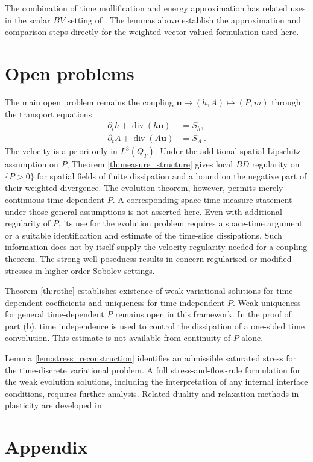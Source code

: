 \documentclass{article}
\theoremstyle{definition}
\newcommand{\bfu}{\boldsymbol{u}}
\renewcommand\div{\operatorname{\mathrm{div}}}
\begin{document}
The combination of time mollification and energy approximation has related
uses in the scalar $BV$ setting of \cite[Sections 3 and 4]{E25}. The lemmas above establish
the approximation and comparison steps directly for the weighted
vector-valued formulation used here.

\section{Open problems}
The main open problem remains the coupling
$\bfu\mapsto(h,A)\mapsto(P,m)$ through the transport equations
\begin{align*}
    \partial_t h+\div(h\bfu)&=S_h,\\
    \partial_t A+\div(A\bfu)&=S_A \ .
\end{align*}
The velocity is a priori only in $L^3(Q_T)$. Under the additional spatial
Lipschitz assumption on $P$, Theorem \ref{th:measure_structure} gives local
$BD$ regularity on $\{P>0\}$ for spatial fields of finite dissipation and
a bound on the negative part of their weighted divergence. The evolution
theorem, however, permits merely continuous time-dependent $P$. A
corresponding space-time measure statement under those general assumptions
is not asserted here. Even with additional regularity of $P$, its use for
the evolution problem requires a space-time argument or a suitable
identification and estimate of the time-slice dissipations. Such information
does not by itself supply the velocity regularity needed for a coupling
theorem. The strong well-posedness results in \cite{LTT22,BDHH22,B25} concern
regularised or modified stresses in higher-order Sobolev settings.

Theorem \ref{th:rothe} establishes existence of weak variational solutions
for time-dependent coefficients and uniqueness for time-independent $P$.
Weak uniqueness for general time-dependent $P$ remains open in this
framework. In the proof of part (b),
time independence is used to control the dissipation of a one-sided time
convolution. This estimate is not available from continuity of $P$ alone.

Lemma \ref{lem:stress_reconstruction} identifies an admissible saturated
stress for the time-discrete variational problem. A full stress-and-flow-rule
formulation for the weak evolution solutions, including the interpretation
of any internal interface conditions, requires further analysis. Related
duality and relaxation methods in plasticity are developed in \cite{RG80,KT83}.

\section{Appendix}
\end{document}
